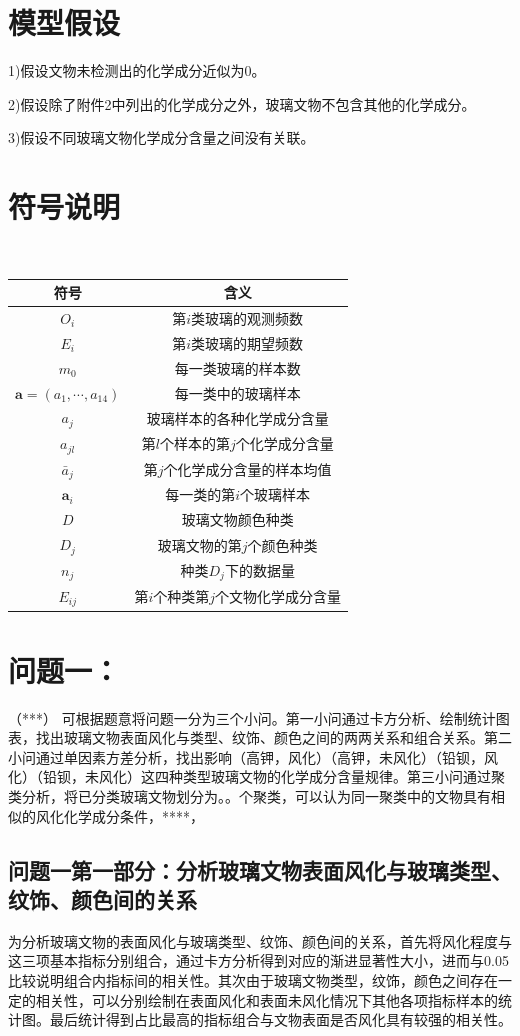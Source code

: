 \documentclass[withoutpreface,bwprint]{cumcmthesis}
\begin{document}
\section{模型假设}
1)假设文物未检测出的化学成分近似为0。

2)假设除了附件2中列出的化学成分之外，玻璃文物不包含其他的化学成分。

3)假设不同玻璃文物化学成分含量之间没有关联。

\section{符号说明}
\begin{table}[H]
	\centering
	\
	\begin{tabularx}{\textwidth}{CC}
		\toprule
		符号 & 含义 \\
		\midrule
		$O_i$ & 第$i$类玻璃的观测频数\\
		$E_i$ & 第$i$类玻璃的期望频数\\
		$m_0$ & 每一类玻璃的样本数\\
		$\bm{a}=(a_1,\cdots,a_{14})$ & 每一类中的玻璃样本\\
		$a_j$ & 玻璃样本的各种化学成分含量\\
		$a_{jl}$ & 第$l$个样本的第$j$个化学成分含量\\
		$\bar{a}_j$ & 第$j$个化学成分含量的样本均值\\
		$\bm{a}_i$ & 每一类的第$i$个玻璃样本\\
		$D$ & 玻璃文物颜色种类\\
		$D_j$ & 玻璃文物的第$j$个颜色种类\\
		$n_j$ & 种类$D_j$下的数据量\\
		$E_{ij}$ & 第$i$个种类第$j$个文物化学成分含量\\
		\bottomrule
	\end{tabularx}
\end{table}

\section{问题一：}（***）
可根据题意将问题一分为三个小问。第一小问通过卡方分析、绘制统计图表，找出玻璃文物表面风化与类型、纹饰、颜色之间的两两关系和组合关系。第二小问通过单因素方差分析，找出影响（高钾，风化）（高钾，未风化）（铅钡，风化）（铅钡，未风化）这四种类型玻璃文物的化学成分含量规律。第三小问通过聚类分析，将已分类玻璃文物划分为。。个聚类，可以认为同一聚类中的文物具有相似的风化化学成分条件，****，
\subsection{问题一第一部分：分析玻璃文物表面风化与玻璃类型、纹饰、颜色间的关系}	
为分析玻璃文物的表面风化与玻璃类型、纹饰、颜色间的关系，首先将风化程度与这三项基本指标分别组合，通过卡方分析得到对应的渐进显著性大小，进而与0.05比较说明组合内指标间的相关性。其次由于玻璃文物类型，纹饰，颜色之间存在一定的相关性，可以分别绘制在表面风化和表面未风化情况下其他各项指标样本的统计图。最后统计得到占比最高的指标组合与文物表面是否风化具有较强的相关性。
\end{document}
